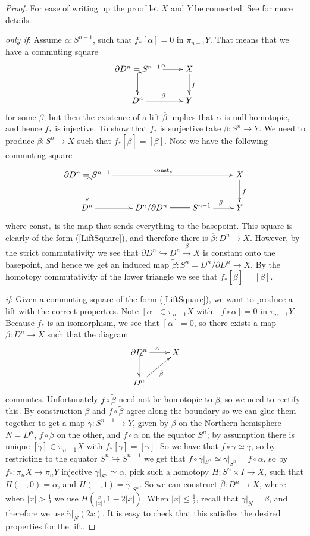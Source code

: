 \documentclass{article}
\newtheorem{proposed work}[theorem]{Proposed Work}
\newcommand{\xymat}[1]{\begin{align*}\xymatrix{ #1}\end{align*}}
\begin{document}
\begin{proof}
For ease of writing up the proof let $X$ and $Y$ be connected. See \cite{may1999concise} for more details.

\emph{only if}: Assume $\alpha: S^{n-1}$, such that $f_*[\alpha]=0$ in $\pi_{n-1}Y$. That means that we have a commuting square 
\xymat{\partial D^n=S^{n-1} \ar[r]^\alpha \ar@{^{(}->}[d] & X \ar[d]^f \\ D^n \ar[r]^\beta & Y} for some $\beta$; but then the existence of a lift $\overline{\beta}$ implies that $\alpha$ is null homotopic, and hence $f_*$ is injective. To show that $f_*$ is surjective take $\beta: S^n\to Y$. We need to produce $\tilde{\beta}: S^n\to X$ such that $f_*[\tilde{\beta}]=[\beta]$. Note we have the following commuting square
\xymat{\partial D^n=S^{n-1} \ar[rrr]^{\text{const}_*} \ar@{^{(}->}[d]& & & X \ar[d]^f \\ D^n \ar[r] & D^n/\partial D^n \ar@{=}[r]&S^{n-1} \ar[r]^\beta & Y}
where $\text{const}_*$ is the map that sends everything to the basepoint. This square is clearly of the form (\ref{LiftSquare}), and therefore there is $\overline{\beta}: D^n \to X$. However, by the strict commutativity we see that $\partial D^n \hookrightarrow D^n \stackrel{\beta}{\to} X$ is constant onto the basepoint, and hence we get an induced map $\tilde{\beta}:S^n=D^n/\partial D^n \to X$. By the homotopy commutativity of the lower triangle we see that $f_*[\tilde{\beta}]=[\beta]$.

\emph{if}: Given a commuting square of the form (\ref{LiftSquare}), we want to produce a lift with the correct properties. Note $[\alpha]\in\pi_{n-1} X$ with $[f\circ \alpha]=0$ in $\pi_{n-1} Y$. Because $f_*$ is an isomorphism, we see that $[\alpha]=0$, so there exists a map $\tilde{\beta}:D^n\to X$ such that the diagram
\xymat{\partial D^n \ar@{^{(}->}[d] \ar[r]^\alpha & X \\ D^n\ar[ur]_{\tilde{\beta}}}
commutes. Unfortunately $f\circ \tilde{\beta}$ need not be homotopic to $\beta$, so we need to rectify this. By construction $\beta$ and $f\circ \tilde{\beta}$ agree along the boundary so we can glue them together to get a map $\gamma: S^{n+1}\to Y$, given by $\beta$ on the Northern hemisphere $N=D^n$, $f\circ \tilde{\beta}$ on the other, and $f\circ \alpha$ on the equator $S^n$; by assumption there is unique $[\tilde{\gamma}]\in \pi_{n+1}X$ with $f_*[\tilde{\gamma}]=[\gamma]$. So we have that $f\circ \tilde{\gamma}\simeq \gamma$, so by restricting to the equator $S^n\hookrightarrow S^{n+1}$ we get
that $f\circ \tilde{\gamma}|_{S^n}\simeq \gamma|_{S^n}= f\circ \alpha$, so by $f_*:\pi_nX \to \pi_nY$ injective $\tilde{\gamma}|_{S^n}\simeq \alpha$, pick such a homotopy $H:S^n\times I \to X$, such that $H(-,0)=\alpha$, and $H(-,1)=\tilde{\gamma}|_{S^n}$. 
So we can construct $\overline{\beta}: D^n\to X$, where when $|x|>\frac{1}{2}$ we use $H(\frac{x}{|x|}, 1-2|x|)$. When $|x| \leq \frac{1}{2}$, recall that $\gamma|_N=\beta$, and therefore we use $\tilde{\gamma}|_N(2x)$.
 It is easy to check that this satisfies the desired properties for the lift.
\end{proof}
\end{document}
